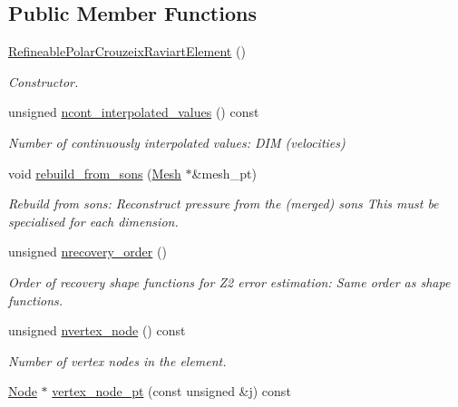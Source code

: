 \subsection*{Public Member Functions}
\begin{DoxyCompactItemize}
\item 
\hyperlink{classoomph_1_1RefineablePolarCrouzeixRaviartElement_a0a3438dcf6d0ca68d81941ab93799023}{Refineable\+Polar\+Crouzeix\+Raviart\+Element} ()
\begin{DoxyCompactList}\small\item\em Constructor. \end{DoxyCompactList}\item 
unsigned \hyperlink{classoomph_1_1RefineablePolarCrouzeixRaviartElement_a7541eaf63cc4f45427acaa169d165f66}{ncont\+\_\+interpolated\+\_\+values} () const
\begin{DoxyCompactList}\small\item\em Number of continuously interpolated values\+: D\+IM (velocities) \end{DoxyCompactList}\item 
void \hyperlink{classoomph_1_1RefineablePolarCrouzeixRaviartElement_aaf733531b51ac3ac642f5830b0e2eb3b}{rebuild\+\_\+from\+\_\+sons} (\hyperlink{classoomph_1_1Mesh}{Mesh} $\ast$\&mesh\+\_\+pt)
\begin{DoxyCompactList}\small\item\em Rebuild from sons\+: Reconstruct pressure from the (merged) sons This must be specialised for each dimension. \end{DoxyCompactList}\item 
unsigned \hyperlink{classoomph_1_1RefineablePolarCrouzeixRaviartElement_a7425e9813dccd141f9a377d6478876f2}{nrecovery\+\_\+order} ()
\begin{DoxyCompactList}\small\item\em Order of recovery shape functions for Z2 error estimation\+: Same order as shape functions. \end{DoxyCompactList}\item 
unsigned \hyperlink{classoomph_1_1RefineablePolarCrouzeixRaviartElement_a1e444d850f0b74355b1474fd49f239d1}{nvertex\+\_\+node} () const
\begin{DoxyCompactList}\small\item\em Number of vertex nodes in the element. \end{DoxyCompactList}\item 
\hyperlink{classoomph_1_1Node}{Node} $\ast$ \hyperlink{classoomph_1_1RefineablePolarCrouzeixRaviartElement_a1de048c6cb46845803026af04082457a}{vertex\+\_\+node\+\_\+pt} (const unsigned \&j) const

\end{DoxyCompactItemize}
